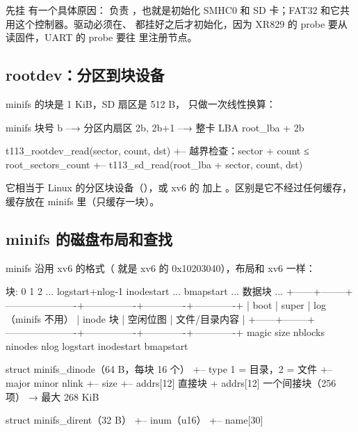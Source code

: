 先挂 \file{/} 有一个具体原因： 负责 ，也就是初始化 SMHC0 和 SD 卡；FAT32 和它共用这个控制器。驱动必须在、 都挂好之后才初始化，因为 XR829 的 probe 要从  读固件，UART 的 probe 要往  里注册节点。

\subsection{rootdev：分区到块设备}

minifs 的块是 1 KiB，SD 扇区是 512 B， 只做一次线性换算：

\begin{txtcode}
minifs 块号 b  --→  分区内扇区 2b, 2b+1  --→  整卡 LBA root_lba + 2b

t113_rootdev_read(sector, count, dst)
+-- 越界检查：sector + count ≤ root_sectors_count
+-- t113_sd_read(root_lba + sector, count, dst)
\end{txtcode}

它相当于 Linux 的分区块设备（），或 xv6 的 加上 。区别是它不经过任何缓存，缓存放在 minifs 里（只缓存一块）。

\subsection{minifs 的磁盘布局和查找}

minifs 沿用 xv6  的格式（ 就是 xv6 的  0x10203040），布局和 xv6 一样：

\begin{txtcode}[basicstyle=\ttfamily\scriptsize]
块:  0       1        2 ... logstart+nlog-1   inodestart ...     bmapstart ...   数据块 ...
    +------+--------+----------------------+----------------+-------------+-------------+
    | boot | super  | log（minifs 不用）    | inode 块        | 空闲位图     | 文件/目录内容 |
    +------+--------+----------------------+----------------+-------------+-------------+
           magic size nblocks ninodes nlog logstart inodestart bmapstart

struct minifs_dinode（64 B，每块 16 个）
+-- type  1 = 目录，2 = 文件
+-- major minor nlink
+-- size
+-- addrs[12] 直接块 + addrs[12] 一个间接块（256 项）  → 最大 268 KiB

struct minifs_dirent（32 B）
+-- inum（u16）
+-- name[30]
\end{txtcode}

